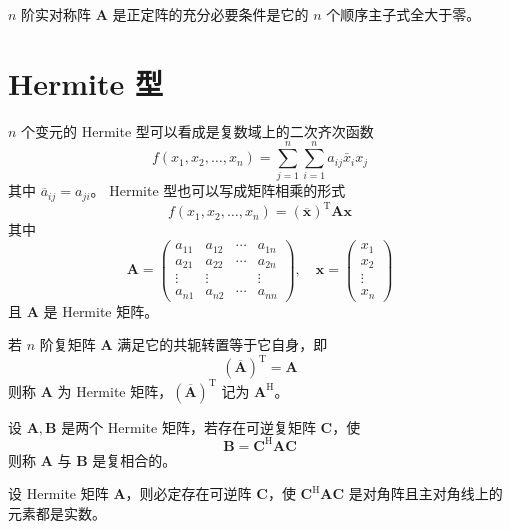\begin{theorem}
    $n$ 阶实对称阵 $\bm{A}$ 是正定阵的充分必要条件是它的 $n$ 个顺序主子式全大于零。
\end{theorem}


\section{Hermite 型}

\begin{definition}
    $n$ 个变元的 Hermite 型可以看成是复数域上的二次齐次函数
    \[
        f(x_1, x_2, \ldots, x_n) = \sum_{j = 1}^{n}\sum_{i = 1}^{n}a_{ij}\bar{x}_{i}x_{j}
    \]
    其中 $\overline{a}_{ij} = a_{ji}$。
    Hermite 型也可以写成矩阵相乘的形式
    \[
        f(x_1, x_2, \ldots, x_n) = (\overline{\bm{x}})^{\mathrm{T}}\bm{Ax}
    \]
    其中
    \[
        \bm{A} = \begin{pmatrix}
            a_{11} & a_{12} & \cdots & a_{1n} \\
            a_{21} & a_{22} & \cdots & a_{2n} \\
            \vdots & \vdots & \      & \vdots \\
            a_{n1} & a_{n2} & \cdots & a_{nn}
        \end{pmatrix},\quad
        \bm{x} = \begin{pmatrix}
            x_1    \\
            x_2    \\
            \vdots \\
            x_n
        \end{pmatrix}
    \]
    且 $\bm{A}$ 是 Hermite 矩阵。
\end{definition}

\begin{definition}
    若 $n$ 阶复矩阵 $\bm{A}$ 满足它的共轭转置等于它自身，即
    \[
        (\overline{\bm{A}})^{\mathrm{T}} = \bm{A}
    \]
    则称 $\bm{A}$ 为 Hermite 矩阵，$(\overline{\bm{A}})^{\mathrm{T}}$ 记为 $\bm{A}^{\mathrm{H}}$。
\end{definition}

\begin{definition}
    设 $\bm{A}, \bm{B}$ 是两个 Hermite 矩阵，若存在可逆复矩阵 $\bm{C}$，使
    \[
        \bm{B} = \bm{C}^{\mathrm{H}}\bm{AC}
    \]
    则称 $\bm{A}$ 与 $\bm{B}$ 是复相合的。
\end{definition}

\begin{theorem}
    设 Hermite 矩阵 $\bm{A}$，则必定存在可逆阵 $\bm{C}$，使 $\bm{C}^{\mathrm{H}}\bm{AC}$ 是对角阵且主对角线上的元素都是实数。
\end{theorem}

